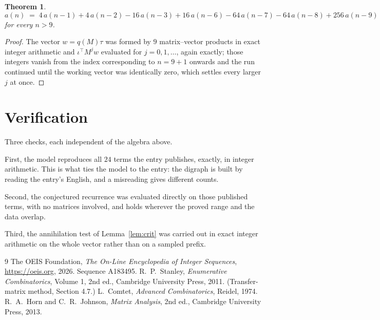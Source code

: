 \documentclass[11pt,a4paper]{article}
\theoremstyle{plain}
\newtheorem{theorem}{Theorem}
\theoremstyle{definition}
\begin{document}
\begin{theorem}
\[
a(n)\;=\;4\,a(n-1) + 4\,a(n-2) - 16\,a(n-3) + 16\,a(n-6) - 64\,a(n-7) - 64\,a(n-8) + 256\,a(n-9)
\]
for every $n>9$.
\end{theorem}

\begin{proof}
The vector $w=q(M)\tau$ was formed by $9$ matrix--vector products in exact integer
arithmetic and $\iota^{\!\top}M^{j}w$ evaluated for $j=0,1,\dots$, again exactly; those
integers vanish from the index corresponding to $n=9+1$ onwards and the run continued
until the working vector was identically zero, which settles every larger $j$ at once.
\end{proof}

\section{Verification}

Three checks, each independent of the algebra above.

First, the model reproduces all $24$ terms the entry publishes, exactly, in integer
arithmetic. This is what ties the model to the entry: the digraph is built by reading the
entry's English, and a misreading gives different counts.

Second, the conjectured recurrence was evaluated directly on those published terms, with no
matrices involved, and holds wherever the proved range and the data overlap.

Third, the annihilation test of Lemma~\ref{lem:crit} was carried out in exact integer
arithmetic on the whole vector rather than on a sampled prefix.

\begin{thebibliography}{9}
 The OEIS Foundation, \emph{The On-Line Encyclopedia of Integer
Sequences}, \url{https://oeis.org}, 2026. Sequence A183495.
 R.~P.~Stanley, \emph{Enumerative Combinatorics}, Volume 1, 2nd ed.,
Cambridge University Press, 2011. (Transfer-matrix method, Section 4.7.)
 L.~Comtet, \emph{Advanced Combinatorics}, Reidel, 1974.
 R.~A.~Horn and C.~R.~Johnson, \emph{Matrix Analysis}, 2nd ed., Cambridge
University Press, 2013.
\end{thebibliography}
\end{document}
